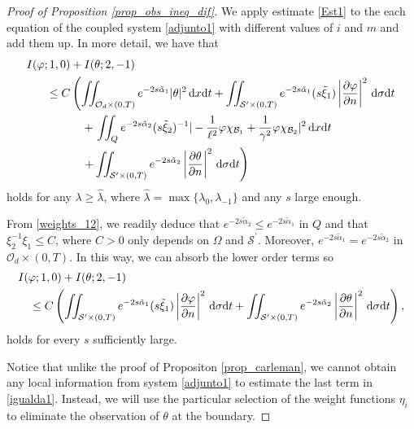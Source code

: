 \documentclass{dcds-bOF}
\theoremstyle{definition}
\newcommand\csin[1]{\chi_{#1}}
\def\dx{\,\textnormal{d}x}
\def\dt{\textnormal{d}t}
\def\d{\,\textnormal{d}}
\begin{document}
\begin{proof}[Proof of Proposition \ref{prop_obs_ineq_dif}]
We apply estimate \eqref{Est1} to the each equation of the coupled system \eqref{adjunto1} with different values of $i$ and $m$ and add them up. In more detail, we have that
%
\begin{align}\notag
I(\varphi;1,0)&+I(\theta;2, -1)\\\notag
\leq C&\left(\iint_{\mathcal O_d\times(0,T)}e^{-2s\tilde{\alpha}_1}|\theta|^2\dx\dt+\iint_{\mathcal S^\prime\times(0,T)}e^{-2s\tilde{\alpha}_1}(s\tilde{\xi}_1)\left|\frac{\partial \varphi}{\partial n}\right|^2\d\sigma\dt\right.\\ \notag
&\quad+\left.\iint_{Q}e^{-2s\tilde{\alpha}_2}(s\tilde{\xi}_2)^{-1}|-\frac{1}{\ell^2}\varphi\csin{\mathcal B_1}+\frac{1}{\gamma^2}\varphi \csin{\mathcal B_2}|^2\dx\dt\right. \\ \notag
&\quad\left.+\iint_{\mathcal S^\prime\times(0,T)}e^{-2s\tilde{\alpha}_2}\left|\frac{\partial \theta}{\partial n}\right|^2\d\sigma\dt\right)
\end{align}
%
holds for any $\lambda\geq\hat\lambda$, where $\hat{\lambda}=\max\{\lambda_0,\lambda_{-1}\}$ and any $s$ large enough.

From \eqref{weights_12}, we readily deduce that $e^{-2s\tilde\alpha_2}\leq e^{-2s\tilde\alpha_1}$ in $Q$ and that $\xi_2^{-1}\xi_1\leq C$, where $C>0$ only depends on $\Omega$ and $\mathcal S^\prime$. Moreover, $e^{-2s\tilde\alpha_1}=e^{-2s\tilde\alpha_2}$ in  $\mathcal O_d\times(0,T)$. In this way, we can absorb the lower order terms so
%
\begin{align}\notag
&I(\varphi;1,0)+I(\theta;2, -1)\\ \label{igualda1}
&\quad \leq C\left(\iint_{\mathcal S^{\prime}\times(0,T)}e^{-2s\tilde{\alpha}_1}(s\tilde{\xi}_1)\left|\frac{\partial \varphi}{\partial n}\right|^2\d\sigma\dt+\iint_{\mathcal S^\prime\times(0,T)}e^{-2s\tilde{\alpha}_2}\left|\frac{\partial \theta}{\partial n}\right|^2\d\sigma\dt\right),
\end{align}
holds for every $s$ sufficiently large.

 Notice that unlike the proof of Propositon \ref{prop_carleman}, we cannot obtain any local information from system \eqref{adjunto1} to estimate the last term in \eqref{igualda1}. Instead, we will use the particular selection of the weight functions $\eta_i$ to eliminate the observation of $\theta$ at the boundary.


\end{proof}
\end{document}
